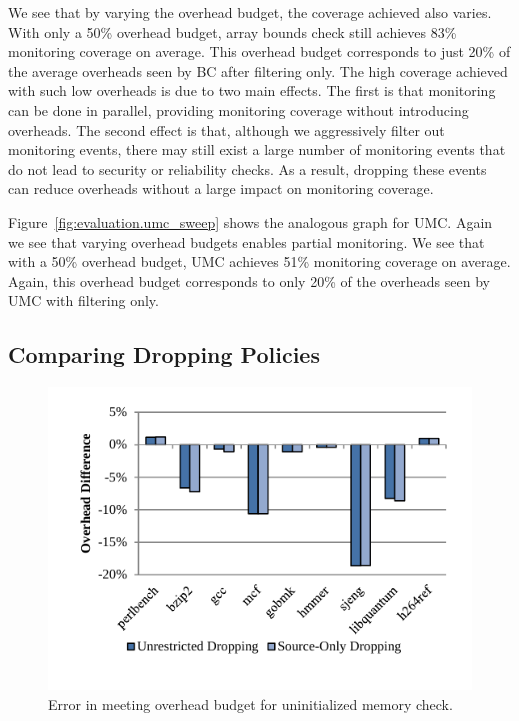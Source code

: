 We see that by varying the overhead budget, the coverage achieved also varies.
With only a 50\% overhead budget, array bounds check still
achieves 83\% monitoring coverage on average. This overhead budget corresponds
to just 20\% of the average overheads seen by BC after filtering only. The high coverage
achieved with such low overheads is due to two main effects.  The first is that
monitoring can be done in parallel, providing monitoring coverage without
introducing overheads. The second effect is that, although we aggressively
filter out monitoring events, there may still exist a large number of
monitoring events that do not lead to security or reliability checks. As a
result, dropping these events can reduce overheads without a large impact on
monitoring coverage.

Figure~\ref{fig:evaluation.umc_sweep} shows the analogous graph for UMC. Again
we see that varying overhead budgets enables partial monitoring. We see that
with a 50\% overhead budget, UMC achieves 51\% monitoring coverage on average.
Again, this overhead budget corresponds to only 20\% of the overheads seen by UMC
with filtering only.

\subsection{Comparing Dropping Policies}

\begin{figure}
  \begin{center}
    \includegraphics[width=\columnwidth]{figs/data_umc_exec_time.pdf}
    \vspace{-0.2in}
    \caption{Error in meeting overhead budget for uninitialized memory check.}
    \label{fig:evaluation.umc_exec_time}
    \vspace{-0.2in}
  \end{center}
\end{figure}


